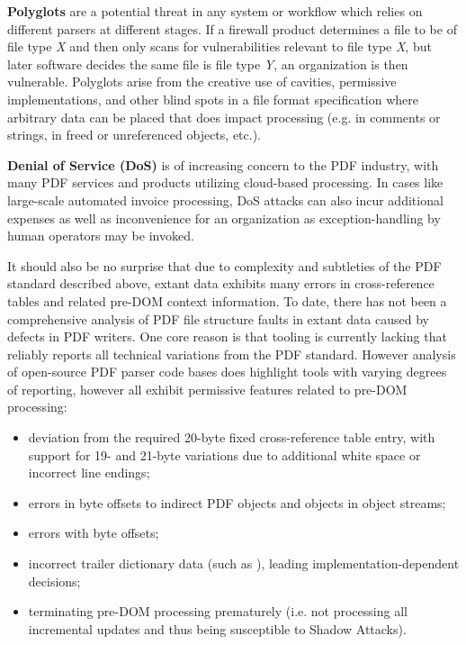{\bf{Polyglots}} are a potential threat in any system or workflow which relies on different parsers
at different stages. If a firewall product determines a file to be of file type \emph{X} and then only 
scans for vulnerabilities relevant to file type \emph{X}, but later software decides the same file 
is file type \emph{Y}, an organization is then vulnerable.
Polyglots arise from the creative use of
cavities, permissive implementations, 
and other blind spots in a file format specification where arbitrary data can be placed 
that does impact processing (e.g. in comments or strings, in freed or unreferenced objects, etc.).

{\bf{Denial of Service (DoS)}} is of increasing concern to the PDF industry, with many PDF services
and products utilizing cloud-based processing. In cases like large-scale automated invoice 
processing, DoS attacks can also incur additional expenses as well as inconvenience for an organization 
as exception-handling by human operators may be invoked.  

It should also be no surprise that due to complexity and subtleties of the PDF standard described above,
extant data exhibits many errors in cross-reference tables and related pre-DOM context information.
To date, there has not been a comprehensive analysis of PDF file structure faults in extant data
caused by defects in PDF writers. One core reason is that tooling is currently lacking that reliably reports
all technical variations from the PDF standard. However analysis of open-source PDF parser code bases
does highlight tools with varying degrees of reporting, however all exhibit permissive features related
to pre-DOM processing:

\begin{itemize}
    \item deviation from the required 20-byte fixed cross-reference table entry, with support for
    19- and 21-byte variations due to additional white space or incorrect line endings;
    \item errors in byte offsets to indirect PDF objects and objects in object streams;
    \item errors with  byte offsets;
    \item incorrect trailer dictionary data (such as ), leading implementation-dependent decisions;  
    \item terminating pre-DOM processing prematurely (i.e. not processing all incremental updates and thus 
    being susceptible to Shadow Attacks).
\end{itemize}
